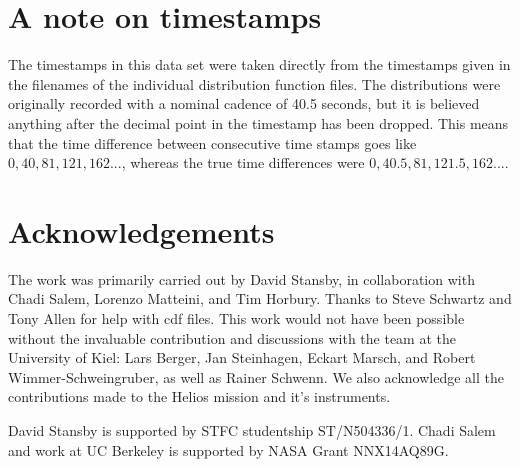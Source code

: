 \documentclass[11pt,a4paper]{article}
\begin{document}
\section{A note on timestamps}
The timestamps in this data set were taken directly from the timestamps given in the filenames of the individual distribution function files. The distributions were originally recorded with a nominal cadence of 40.5 seconds, but it is believed anything after the decimal point in the timestamp has been dropped. This means that the time difference between consecutive time stamps goes like $0, 40, 81, 121, 162...$, whereas the true time differences were $0, 40.5, 81, 121.5, 162...$.
\newpage
\appendix
\section{Acknowledgements}
The work was primarily carried out by David Stansby, in collaboration with Chadi Salem, Lorenzo Matteini, and Tim Horbury. Thanks to Steve Schwartz and Tony Allen for help with cdf files. This work would not have been possible without the invaluable contribution and discussions with the team at the University of Kiel: Lars Berger, Jan Steinhagen, Eckart Marsch, and Robert Wimmer-Schweingruber, as well as Rainer Schwenn. We also acknowledge all the contributions made to the Helios mission and it's instruments.

David Stansby is supported by STFC studentship ST/N504336/1. Chadi Salem and work at UC Berkeley is supported by NASA Grant NNX14AQ89G. 
\end{document}
